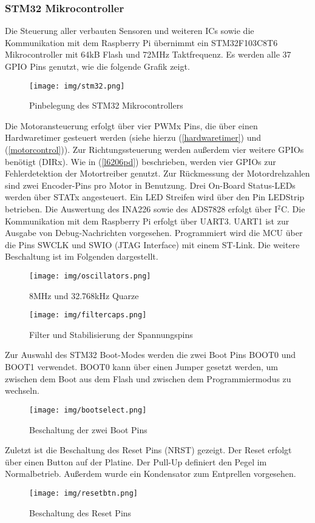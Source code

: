 \documentclass[12pt, a4paper]{report}
\begin{document}
            \subsubsection{STM32 Mikrocontroller}
            Die Steuerung aller verbauten Sensoren und weiteren ICs sowie die Kommunikation mit dem Raspberry Pi übernimmt ein STM32F103C8T6 Mikrocontroller mit 64kB Flash und 72MHz Taktfrequenz. Es werden alle 37 GPIO Pins genutzt, wie die folgende Grafik zeigt.
            \begin{figure}[H]
               \centering
               \texttt{[image: img/stm32.png]}
               \caption{Pinbelegung des STM32 Mikrocontrollers}
            \end{figure}
            Die Motoransteuerung erfolgt über vier PWMx Pins, die über einen Hardwaretimer gesteuert werden (siehe hierzu (\ref{hardwaretimer}) und (\ref{motorcontrol})).
            Zur Richtungssteuerung werden außerdem vier weitere GPIOs benötigt (DIRx). Wie in (\ref{l6206pd}) beschrieben, werden vier GPIOs zur Fehlerdetektion der Motortreiber genutzt. Zur Rückmessung der Motordrehzahlen sind zwei Encoder-Pins pro Motor in Benutzung.
            Drei On-Board Status-LEDs werden über STATx angesteuert. Ein LED Streifen wird über den Pin LEDStrip betrieben. Die Auswertung des INA226 sowie des ADS7828 erfolgt über I$^2$C. Die Kommunikation mit dem Raspberry Pi erfolgt über UART3. UART1 ist zur Ausgabe von Debug-Nachrichten vorgesehen. 
            Programmiert wird die MCU über die Pins SWCLK und SWIO (JTAG Interface) mit einem ST-Link. Die weitere Beschaltung ist im Folgenden dargestellt.
            \begin{figure}[H]
               \centering
               \texttt{[image: img/oscillators.png]}
               \caption{8MHz und 32.768kHz Quarze}
            \end{figure}
            \begin{figure}[H]
               \centering
               \texttt{[image: img/filtercaps.png]}
               \caption{Filter und Stabilisierung der Spannungspins}
            \end{figure}
            Zur Auswahl des STM32 Boot-Modes werden die zwei Boot Pins BOOT0 und BOOT1 verwendet. BOOT0 kann über einen Jumper gesetzt werden, um zwischen dem Boot aus dem Flash und zwischen dem Programmiermodus zu wechseln.
            \begin{figure}[H]
               \centering
               \texttt{[image: img/bootselect.png]}
               \caption{Beschaltung der zwei Boot Pins}
            \end{figure}
            Zuletzt ist die Beschaltung des Reset Pins (NRST) gezeigt. Der Reset erfolgt über einen Button auf der Platine. Der Pull-Up definiert den Pegel im Normalbetrieb. Außerdem wurde ein Kondensator zum Entprellen vorgesehen.
            \begin{figure}[H]
               \centering
               \texttt{[image: img/resetbtn.png]}
               \caption{Beschaltung des Reset Pins}
            \end{figure}
\end{document}
